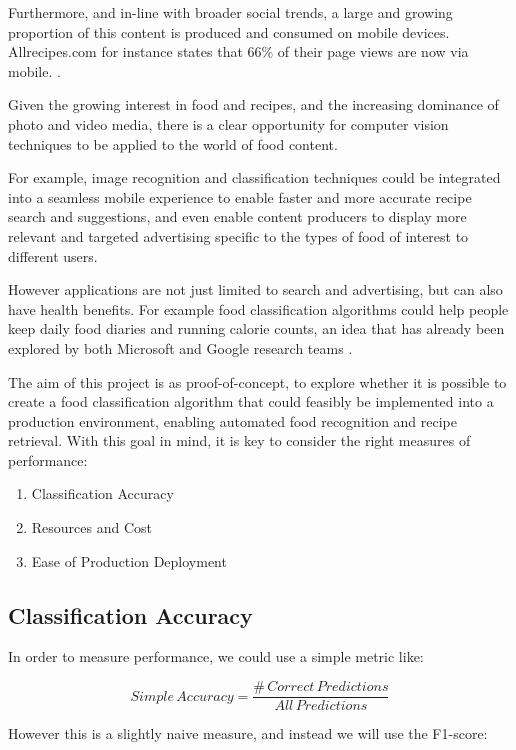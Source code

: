 \documentclass[10pt,a4paper]{article}
\begin{document}
Furthermore, and in-line with broader social trends, a large and growing proportion of this content is produced and consumed on mobile devices. Allrecipes.com for instance states that 66\% of their page views are now via mobile. \cite{allrecipes}.

Given the growing interest in food and recipes, and the increasing dominance of photo and video media, there is a clear opportunity for computer vision techniques to be applied to the world of food content.

For example, image recognition and classification techniques could be integrated into a seamless mobile experience to enable faster and more accurate recipe search and suggestions, and even enable content producers to display more relevant and targeted advertising specific to the types of food of interest to different users.

However applications are not just limited to search and advertising, but can also have health benefits. For example food classification algorithms could help people keep daily food diaries and running calorie counts, an idea that has already been explored by both Microsoft \cite{microsoft} and Google research teams \cite{google}.

The aim of this project is as proof-of-concept, to explore whether it is possible to create a food classification algorithm that could feasibly be implemented into a production environment, enabling automated food recognition and recipe retrieval. With this goal in mind, it is key to consider the right measures of performance:

\begin{enumerate}
\item Classification Accuracy
\item Resources and Cost
\item Ease of Production Deployment
\end{enumerate}

\subsection*{Classification Accuracy}

In order to measure performance, we could use a simple metric like:

\[Simple\, Accuracy = \frac{\#\, Correct\, Predictions}{All\, Predictions}\]

However this is a slightly naive measure, and instead we will use the F1-score:
\end{document}
